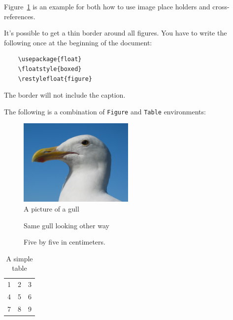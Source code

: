 \documentclass[10pt, a4paper]{article}
\begin{document}
Figure~\ref{placeholder} is an example for both how to use image place holders and cross-references. 

It's possible to get a thin border around all figures. You have to write the following once at the beginning of the document:
\begin{verbatim}
	\usepackage{float}
	\floatstyle{boxed}
	\restylefloat{figure}
\end{verbatim}
The border will not include the caption.

The following is a combination of \texttt{Figure} and \texttt{Table} environments:
\begin{figure}[htbp]
	\caption{A picture of a gull}
	\centering
	\includegraphics[width=0.5\textwidth]{images/gull}
\end{figure}
\begin{figure}[htbp]
	\centering
	\caption{Same gull looking other way}
\end{figure}
\begin{figure}[htbp]
	\makebox[\textwidth]{\framebox[5cm]{\rule{0pt}{5cm}}}
	\caption{Five by five in centimeters.\label{placeholder}}
\end{figure}
\begin{table}[h!]
	\begin{center}
		\begin{tabular}{| l c r |}
			\hline
			1 & 2 & 3 \\
			4 & 5 & 6 \\
			7 & 8 & 9 \\
			\hline
		\end{tabular}
	\end{center}
	\caption{A simple table}
\end{table}
\end{document}
